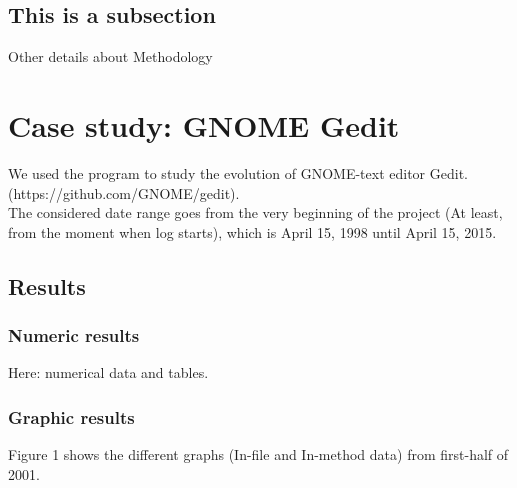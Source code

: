 \documentclass[a4paper]{article}
\begin{document}
\subsection{This is a subsection}

Other details about Methodology

\section{Case study: GNOME Gedit}

We used the program to study the evolution of GNOME-text editor Gedit. 
(https://github.com/GNOME/gedit).\\
The considered date range goes from the very beginning of the project (At
least, from the moment when log starts), which is April 15, 1998 until April
15, 2015.

\subsection{Results}

\subsubsection{Numeric results}

Here: numerical data and tables.

\subsubsection{Graphic results}

Figure 1 shows the different graphs (In-file and In-method data) from
first-half of 2001.\\
\end{document}
